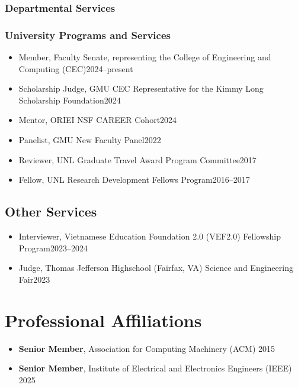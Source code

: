 \documentclass[11pt]{article}
\newcommand{\beforegmu}{\begin{center}\rule{2in}{0.8pt}~\textbf{Before GMU}~\rule{2in}{0.8pt}\end{center}}
\begin{document}
\subsubsection{Departmental Services}

\myunitservices{}


\subsubsection{University Programs and Services}
\begin{itemize}
    \item Member, Faculty Senate, representing the College of Engineering and Computing (CEC)\hfill 2024--present    
    \item Scholarship Judge, GMU CEC Representative for the Kimmy Long Scholarship Foundation\hfill 2024
    \item Mentor, ORIEI NSF CAREER Cohort\hfill 2024
    \item Panelist, GMU New Faculty Panel\hfill 2022
    \item Reviewer,  UNL Graduate Travel Award Program Committee\hfill 2017
    \item Fellow, UNL Research Development Fellows Program\hfill 2016--2017
\end{itemize}


\subsection{Other Services}
\begin{itemize}
    \item  Interviewer, Vietnamese Education Foundation 2.0 (VEF2.0) Fellowship Program\hfill 2023--2024
    \item Judge, Thomas Jefferson Highschool (Fairfax, VA) Science and Engineering Fair\hfill 2023
\end{itemize}

\section{Professional Affiliations}
\begin{itemize}
    \item \textbf{Senior Member},  Association for Computing Machinery (ACM) \hfill  2015
    \item \textbf{Senior Member}, Institute of Electrical and Electronics Engineers (IEEE) \hfill 2025
\end{itemize}
\end{document}

